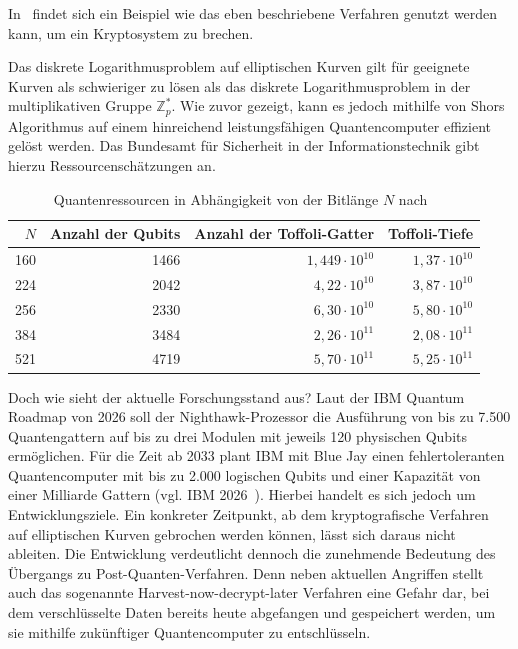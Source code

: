 In~\cite[S.23--27]{eicher97} findet sich ein Beispiel wie das eben beschriebene Verfahren genutzt werden kann, um ein Kryptosystem zu brechen.

Das diskrete Logarithmusproblem auf elliptischen Kurven gilt für geeignete Kurven als schwieriger zu lösen als das diskrete Logarithmusproblem in der multiplikativen Gruppe $\mathbb{Z}_p^*$. Wie zuvor gezeigt, kann es jedoch mithilfe von Shors Algorithmus auf einem hinreichend leistungsfähigen Quantencomputer effizient gelöst werden.
Das Bundesamt für Sicherheit in der Informationstechnik gibt hierzu Ressourcenschätzungen an.
\begin{table}[htbp]
    \centering
    \begin{tabular}{r r r r}
        \hline
        $N$ & Anzahl der Qubits & Anzahl der Toffoli-Gatter
            & Toffoli-Tiefe \\
        \hline
        160 & 1466 & $1{,}449 \cdot 10^{10}$
                   & $1{,}37 \cdot 10^{10}$ \\
        224 & 2042 & $4{,}22 \cdot 10^{10}$
                   & $3{,}87 \cdot 10^{10}$ \\
        256 & 2330 & $6{,}30 \cdot 10^{10}$
                   & $5{,}80 \cdot 10^{10}$ \\
        384 & 3484 & $2{,}26 \cdot 10^{11}$
                   & $2{,}08 \cdot 10^{11}$ \\
        521 & 4719 & $5{,}70 \cdot 10^{11}$
                   & $5{,}25 \cdot 10^{11}$ \\
        \hline
    \end{tabular}
    \caption{Quantenressourcen in Abhängigkeit von der Bitlänge $N$ nach~\cite[S.~60]{wilhelm24}}\label{tab:quantenressourcen}
\end{table}
Doch wie sieht der aktuelle Forschungsstand aus? Laut der IBM Quantum Roadmap von 2026 soll der Nighthawk-Prozessor die Ausführung von bis zu 7.500 Quantengattern auf bis zu drei Modulen mit jeweils 120 physischen Qubits ermöglichen. Für die Zeit ab 2033 plant IBM mit Blue Jay einen fehlertoleranten Quantencomputer mit bis zu 2.000 logischen Qubits und einer Kapazität von einer Milliarde Gattern (vgl. IBM 2026~\cite{ibmQuantumRoadmap}). Hierbei handelt es sich jedoch um Entwicklungsziele. Ein konkreter Zeitpunkt, ab dem kryptografische Verfahren auf elliptischen Kurven gebrochen werden können, lässt sich daraus nicht ableiten. Die Entwicklung verdeutlicht dennoch die zunehmende Bedeutung des Übergangs zu Post-Quanten-Verfahren. Denn neben aktuellen Angriffen stellt auch das sogenannte Harvest-now-decrypt-later Verfahren eine Gefahr dar, bei dem verschlüsselte Daten bereits heute abgefangen und gespeichert werden, um sie mithilfe zukünftiger Quantencomputer zu entschlüsseln.
